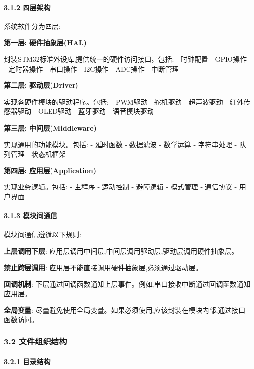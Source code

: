 \documentclass[
]{article}
\begin{document}
\hypertarget{ux56dbux5c42ux67b6ux6784}{%
\paragraph{3.1.2 四层架构}\label{ux56dbux5c42ux67b6ux6784}}

系统软件分为四层:

\textbf{第一层: 硬件抽象层(HAL)}

封装STM32标准外设库,提供统一的硬件访问接口。包括: - 时钟配置 - GPIO操作
- 定时器操作 - 串口操作 - I2C操作 - ADC操作 - 中断管理

\textbf{第二层: 驱动层(Driver)}

实现各硬件模块的驱动程序。包括: - PWM驱动 - 舵机驱动 - 超声波驱动 -
红外传感器驱动 - OLED驱动 - 蓝牙驱动 - 语音模块驱动

\textbf{第三层: 中间层(Middleware)}

实现通用的功能模块。包括: - 延时函数 - 数据滤波 - 数学运算 - 字符串处理
- 队列管理 - 状态机框架

\textbf{第四层: 应用层(Application)}

实现业务逻辑。包括: - 主程序 - 运动控制 - 避障逻辑 - 模式管理 - 通信协议
- 用户界面

\hypertarget{ux6a21ux5757ux95f4ux901aux4fe1}{%
\paragraph{3.1.3 模块间通信}\label{ux6a21ux5757ux95f4ux901aux4fe1}}

模块间通信遵循以下规则:

\textbf{上层调用下层}:
应用层调用中间层,中间层调用驱动层,驱动层调用硬件抽象层。

\textbf{禁止跨层调用}: 应用层不能直接调用硬件抽象层,必须通过驱动层。

\textbf{回调机制}:
下层通过回调函数通知上层事件。例如,串口接收中断通过回调函数通知应用层。

\textbf{全局变量}:
尽量避免使用全局变量。如果必须使用,应该封装在模块内部,通过接口函数访问。

\hypertarget{ux6587ux4ef6ux7ec4ux7ec7ux7ed3ux6784}{%
\subsubsection{3.2
文件组织结构}\label{ux6587ux4ef6ux7ec4ux7ec7ux7ed3ux6784}}

\hypertarget{ux76eeux5f55ux7ed3ux6784}{%
\paragraph{3.2.1 目录结构}\label{ux76eeux5f55ux7ed3ux6784}}
\end{document}

